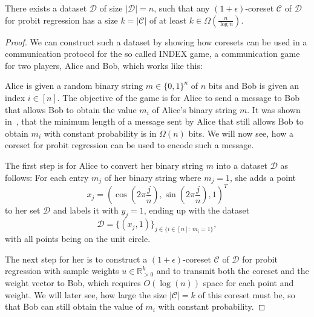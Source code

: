 \begin{theorem}
    \label{theorem:index}
    There exists a dataset $\mathcal{D}$ of size
    $|\mathcal{D}| = n$, such
    that any $(1+\epsilon)$-coreset $\mathcal{C}$ of $\mathcal{D}$
    for probit regression has a size $k = |\mathcal{C}|$
    of at least $k \in \Omega\left(\frac{n}{\log{n}}\right)$.
\end{theorem}
\begin{proof}
    We can construct such a  dataset by showing
    how coresets can be used in a
    communication protocol for the so called INDEX game,
    a communication game for two players, Alice and Bob, which
    works like this:

    Alice is given a random binary string $m \in \{0, 1\}^n$ of $n$ bits
    and Bob is given an index $i \in [n]$.
    The objective of the game is for Alice to send a message to Bob that allows
    Bob to obtain the value $m_i$ of Alice's binary string $m$.
    It was shown in~\cite{index}, that the minimum length of a message
    sent by Alice that still allows Bob to obtain $m_i$ with
    constant probability is in $\Omega(n)$ bits.
    We will now see, how a coreset for probit regression can be used
    to encode such a message.

    The first step is for Alice to convert her binary string $m$ into
    a dataset $\mathcal{D}$ as follows:
    For each entry $m_j$ of her binary string where $m_j = 1$, she adds
    a point
    \begin{equation*}
        x_j = \left( \cos{\left(2 \pi \frac{j}{n}\right)},
        \sin{\left(2 \pi \frac{j}{n}\right)}, 1 \right)^T
    \end{equation*}
    to her set $\mathcal{D}$ and labels it with $y_j = 1$,
    ending up with the dataset
    \begin{equation*}
        \mathcal{D} = \{(x_j, 1)\}_{j \in \{i \in [n]:\ m_i = 1 \}},
    \end{equation*}
    with all points being on the unit circle.

    The next step for her is to construct a
    $(1+\epsilon)$-coreset $\mathcal{C}$ of $\mathcal{D}$
    for probit regression with sample weights $u \in \mathbb{R}^k_{>0}$
    and to transmit both the coreset and the weight vector to Bob,
    which requires $O(\log(n))$ space for each point and
    weight.
    We will later see, how
    large the size $|\mathcal{C}|=k$ of this coreset must be,
    so that Bob can still
    obtain the value of $m_i$ with constant probability.


\end{proof}
